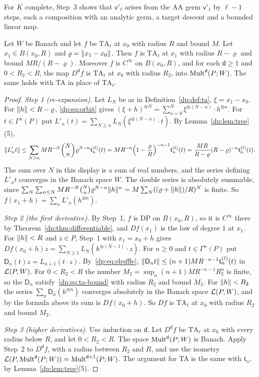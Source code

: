 For $K$ complete, Step~3 shows that $\mathsf v'_\ell$ arises from the AA germ $\mathsf v'_1$ by $\ell-1$ steps, each a composition with an analytic germ, a target descent and a bounded linear map.

\begin{theorem}\label{dp:thm:ta-recenter}
Let $W$ be Banach and let $f$ be $\mathrm{TA}_\ell$ at $x_0$ with radius $R$ and bound $M$. Let $x_1\in B(x_0,R)$ and $\varrho=\lVert x_1-x_0\rVert$. Then $f$ is $\mathrm{TA}_\ell$ at $x_1$ with radius $R-\varrho$ and bound $MR/(R-\varrho)$. Moreover $f$ is $C^\infty$ on $B(x_0,R)$, and for each $\mathsf d\ge1$ and $0<R_2<R$, the map $D^{\mathsf d}f$ is $\mathrm{TA}_\ell$ at $x_0$ with radius $R_2$, into $\operatorname{Mult}^{\mathsf d}(P;W)$. The same holds with TA in place of $\mathrm{TA}_\ell$.
\end{theorem}

\begin{proof}
\emph{Step 1 (re-expansion).} Let $L_N$ be as in Definition~\ref{dp:def:ta}, $\xi=x_1-x_0$. For $\lVert h\rVert<R-\varrho$, \eqref{dp:eq:orbit} gives $(\xi+h)^{\otimes N}=\sum_{n=0}^N\xi^{\otimes(N-n)}\cdot h^{\otimes n}$. For $t\in\Gamma^n(P)$ put $L'_n(t)=\sum_{N\ge n}L_N(\xi^{\otimes(N-n)}\cdot t)$. By Lemma~\ref{dp:lem:tree}(5),
\[
 \lVert L'_nt\rVert\le\sum_{N\ge n}MR^{-N}\binom Nn\varrho^{N-n}\mathfrak t^{(\ell)}_n(t)=MR^{-n}\Bigl(1-\frac\varrho R\Bigr)^{-n-1}\mathfrak t^{(\ell)}_n(t)=\frac{MR}{R-\varrho}(R-\varrho)^{-n}\mathfrak t^{(\ell)}_n(t).
\]
The sum over $N$ in this display is a sum of real numbers, and the series defining $L'_nt$ converges in the Banach space $W$. The double series is absolutely summable, since $\sum_N\sum_{n\le N}MR^{-N}\binom Nn\varrho^{N-n}\lVert h\rVert^n=M\sum_N((\varrho+\lVert h\rVert)/R)^N$ is finite. So $f(x_1+h)=\sum_nL'_n(h^{\otimes n})$.

\emph{Step 2 (the first derivative).} By Step~1, $f$ is DP on $B(x_0,R)$, so it is $C^\infty$ there by Theorem~\ref{dp:thm:differentiable}, and $Df(x_1)$ is the law of degree $1$ at $x_1$. For $\lVert h\rVert<R$ and $z\in P$, Step~1 with $x_1=x_0+h$ gives $Df(x_0+h)z=\sum_{N\ge1}L_N(h^{\otimes(N-1)}\cdot z)$. For $n\ge0$ and $t\in\Gamma^n(P)$ put $\mathsf D_n(t)z=L_{n+1}(t\cdot z)$. By~\eqref{dp:eq:shuffle}, $\lVert \mathsf D_nt\rVert\le(n+1)MR^{-n-1}\mathfrak t^{(\ell)}_n(t)$ in $\mathcal L(P,W)$. For $0<R_2<R$ the number $M_2=\sup_n(n+1)MR^{-n-1}R_2^n$ is finite, so the $\mathsf D_n$ satisfy~\eqref{dp:eq:ta-bound} with radius $R_2$ and bound $M_2$. For $\lVert h\rVert<R_2$ the series $\sum_n\mathsf D_n(h^{\otimes n})$ converges absolutely in the Banach space $\mathcal L(P,W)$, and by the formula above its sum is $Df(x_0+h)$. So $Df$ is $\mathrm{TA}_\ell$ at $x_0$ with radius $R_2$ and bound $M_2$.

\emph{Step 3 (higher derivatives).} Use induction on $\mathsf d$. Let $D^{\mathsf d}f$ be $\mathrm{TA}_\ell$ at $x_0$ with every radius below $R$, and let $0<R_2<R$. The space $\operatorname{Mult}^{\mathsf d}(P;W)$ is Banach. Apply Step~2 to $D^{\mathsf d}f$, with a radius between $R_2$ and $R$, and use the isometry $\mathcal L(P,\operatorname{Mult}^{\mathsf d}(P;W))=\operatorname{Mult}^{\mathsf d+1}(P;W)$. The argument for TA is the same with $\mathfrak t_n$, by Lemma~\ref{dp:lem:tree}(5).
\end{proof}

